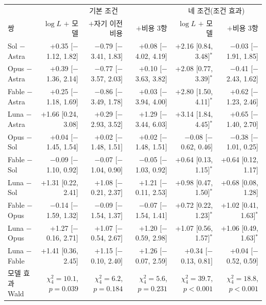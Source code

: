 \begin{tabular}{lrrrrr}
\toprule
 & \multicolumn{3}{c}{기본 조건} & \multicolumn{2}{c}{네 조건(조건 효과)} \\
\cmidrule(lr){2-4}\cmidrule(l){5-6}
쌍 & $\log L$ $+$ 모델 & \shortstack{$+$자기 이전\\비용} & $+$비용 3항 & $\log L$ $+$ 모델 & $+$비용 3항 \\
\midrule
Sol $-$ Astra & +0.35 [$-$1.12, 1.82] & $-$0.79 [$-$3.41, 1.83] & +0.08 [$-$4.02, 4.19] & +2.16 [0.84, 3.48]$^{*}$ & $-$0.03 [$-$1.91, 1.85] \\
Opus $-$ Astra & +0.39 [$-$1.36, 2.14] & $-$0.77 [$-$3.57, 2.03] & +0.10 [$-$3.63, 3.82] & +2.08 [0.77, 3.39]$^{*}$ & $-$0.41 [$-$2.43, 1.62] \\
Fable $-$ Astra & +0.25 [$-$1.18, 1.69] & $-$0.86 [$-$3.49, 1.78] & +0.03 [$-$3.94, 4.00] & +2.80 [1.50, 4.11]$^{*}$ & +0.62 [$-$1.23, 2.46] \\
Luna $-$ Astra & +1.66 [0.24, 3.08] & +0.29 [$-$2.93, 3.52] & +1.29 [$-$3.44, 6.03] & +3.14 [1.84, 4.45]$^{*}$ & +0.65 [$-$1.40, 2.70] \\
Opus $-$ Sol & +0.04 [$-$1.45, 1.54] & +0.02 [$-$1.48, 1.51] & +0.02 [$-$1.48, 1.51] & $-$0.08 [$-$0.62, 0.46] & $-$0.38 [$-$1.01, 0.25] \\
Fable $-$ Sol & $-$0.09 [$-$1.10, 0.92] & $-$0.07 [$-$1.04, 0.90] & $-$0.05 [$-$1.03, 0.92] & +0.64 [0.13, 1.15]$^{*}$ & +0.64 [0.12, 1.17] \\
Luna $-$ Sol & +1.31 [0.22, 2.41] & +1.08 [$-$0.21, 2.37] & +1.21 [$-$0.11, 2.53] & +0.98 [0.47, 1.50]$^{*}$ & +0.68 [0.08, 1.28] \\
Fable $-$ Opus & $-$0.14 [$-$1.59, 1.32] & $-$0.09 [$-$1.54, 1.37] & $-$0.07 [$-$1.54, 1.41] & +0.72 [0.22, 1.23]$^{*}$ & +1.02 [0.41, 1.63]$^{*}$ \\
Luna $-$ Opus & +1.27 [$-$0.16, 2.71] & +1.07 [$-$0.54, 2.67] & +1.20 [$-$0.59, 2.98] & +1.07 [0.56, 1.57]$^{*}$ & +1.06 [0.49, 1.63]$^{*}$ \\
Luna $-$ Fable & +1.41 [0.36, 2.45] & +1.15 [$-$0.10, 2.40] & +1.26 [$-$0.07, 2.59] & +0.34 [$-$0.13, 0.81] & +0.04 [$-$0.52, 0.59] \\
\midrule
모델 효과 Wald & $\chi^2_{4}=10.1$, $p=0.039$ & $\chi^2_{4}=6.2$, $p=0.184$ & $\chi^2_{4}=5.6$, $p=0.231$ & $\chi^2_{4}=39.7$, $p<0.001$ & $\chi^2_{4}=18.8$, $p<0.001$ \\
\bottomrule
\end{tabular}
